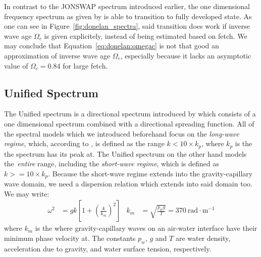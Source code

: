%

In contrast to the JONSWAP spectrum introduced earlier, the one dimensional 
frequency spectrum as given by \citeauthor{article:Donelan1985} is able to
transition to fully developed state. As one can see in
Figure~\ref{fig:donelan_spectra}, said transition does work if inverse wave age
$\Omega_c$ is given explicitely, instead of being estimated based on fetch.
We may conclude that Equation~\ref{eq:donelan:omegac} is not that good an
approximation of inverse wave age $\Omega_c$, especially because it lacks an
asymptotic value of $\Omega_c=0.84$ for large fetch.
%
\subsection{Unified Spectrum}
\label{sec:unified_spectrum}
%
The Unified spectrum is a directional \wavenumber spectrum introduced by
\citet{article:Elfouhaily1997} which consists of a one 
dimensional \wavenumber spectrum combined with a directional spreading 
function. All of the spectral models which we introduced beforehand focus on 
the \emph{long-wave regime}, which, according to \citeauthor{article:Elfouhaily1997},
is defined as the \wavenumber range $k < 10\times k_p$, where $k_p$ is
the \wavenumber the spectrum has its peak at. The Unified spectrum on the
other hand models the~\emph{entire} \wavenumber range, including the
\emph{short-wave regime}, which is defined as $k >= 10\times k_p$.
Because the short-wave regime extends into the gravity-capillary wave domain,
we need a dispersion relation which extends into said domain too.
We may write:
\begin{align}
\omega^2 &= gk\left[1 + \left(\frac{k}{k_m}\right)^2\right] &
k_m &= \sqrt{\frac{p_w g}{T}} = 370~\text{rad}\cdot\text{m}^{-1}
\end{align}
where $k_m$ is the \wavenumber where gravity-capillary waves on an air-water
interface have their minimum phase velocity at. The constants $p_w$, $g$ and
$T$ are water density, acceleration due to gravity, and water surface tension,
respectively.


